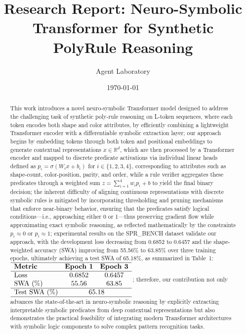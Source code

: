 \documentclass{article}
\title{Research Report: Neuro-Symbolic Transformer for Synthetic PolyRule Reasoning}
\author{Agent Laboratory}
\date{\today}
\begin{document}
\maketitle

\begin{abstract}
This work introduces a novel neuro‐symbolic Transformer model designed to address the challenging task of synthetic poly‐rule reasoning on L-token sequences, where each token encodes both shape and color attributes, by efficiently combining a lightweight Transformer encoder with a differentiable symbolic extraction layer; our approach begins by embedding tokens through both token and positional embeddings to generate contextual representations \(x \in \mathbb{R}^{d}\), which are then processed by a Transformer encoder and mapped to discrete predicate activations via individual linear heads defined as \(p_i = \sigma(W_i x + b_i)\) for \(i \in \{1,2,3,4\}\), corresponding to attributes such as shape-count, color-position, parity, and order, while a rule verifier aggregates these predicates through a weighted sum \(z = \sum_{i=1}^4 w_i p_i + b\) to yield the final binary decision; the inherent difficulty of aligning continuous representations with discrete symbolic rules is mitigated by incorporating thresholding and pruning mechanisms that enforce near-binary behavior, ensuring that the predicates satisfy logical conditions—i.e., approaching either 0 or 1—thus preserving gradient flow while approximating exact symbolic reasoning, as reflected mathematically by the constraints \(p_i \approx 0\) or \(p_i \approx 1\); experimental results on the SPR\_BENCH dataset validate our approach, with the development loss decreasing from 0.6852 to 0.6457 and the shape-weighted accuracy (SWA) improving from 55.56\% to 63.85\% over three training epochs, ultimately achieving a test SWA of 65.18\%, as summarized in Table~1: \(\begin{array}{lcc}\hline \textbf{Metric} & \textbf{Epoch 1} & \textbf{Epoch 3} \\ \hline \text{Loss} & 0.6852 & 0.6457 \\ \text{SWA (\%)} & 55.56 & 63.85 \\ \hline \text{Test SWA (\%)} & \multicolumn{2}{c}{65.18} \\ \hline\end{array}\); therefore, our contribution not only advances the state-of-the-art in neuro-symbolic reasoning by explicitly extracting interpretable symbolic predicates from deep contextual representations but also demonstrates the practical feasibility of integrating modern Transformer architectures with symbolic logic components to solve complex pattern recognition tasks.
\end{abstract}
\end{document}
